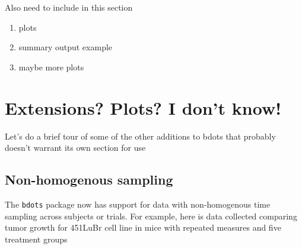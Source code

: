 \documentclass{article}
\begin{document}


Also need to include in this section

\begin{enumerate}
\item plots
\item summary output example
\item maybe more plots
\end{enumerate}

\section{Extensions? Plots? I don't know!}

Let's do a brief tour of some of the other additions to bdots that probably doesn't warrant its own section for use

\subsection{Non-homogenous sampling}

The \texttt{bdots} package now has support for data with non-homogenous time sampling across subjects or trials. For example, here is data collected comparing tumor growth for 451LuBr cell line in mice with repeated measures and five treatment groups
\end{document}
